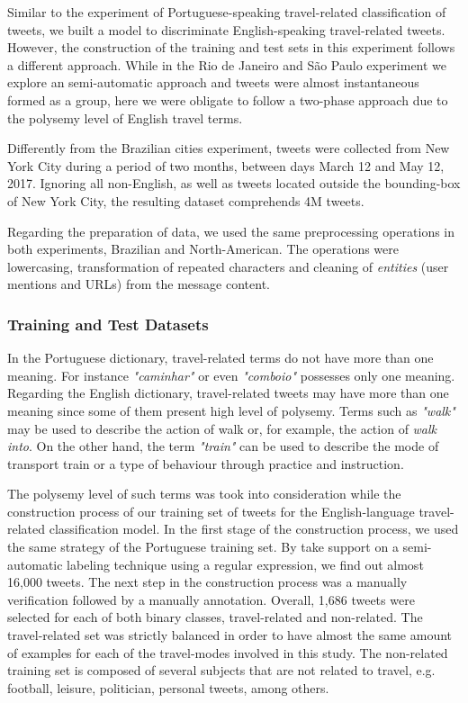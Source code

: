 Similar to the experiment of Portuguese-speaking travel-related classification of tweets, we built a model to discriminate English-speaking travel-related tweets. However, the construction of the training and test sets in this experiment follows a different approach. While in the Rio de Janeiro and São Paulo experiment we explore an semi-automatic approach and tweets were almost instantaneous formed as a group, here we were obligate to follow a two-phase approach due to the polysemy level of English travel terms.

Differently from the Brazilian cities experiment, tweets were collected from New York City during a period of two months, between days March 12 and May 12, 2017. Ignoring all non-English, as well as tweets located outside the bounding-box of New York City, the resulting dataset comprehends 4M tweets.

Regarding the preparation of data, we used the same preprocessing operations in both experiments, Brazilian and North-American. The operations were lowercasing, transformation of repeated characters and cleaning of \emph{entities} (user mentions and URLs) from the message content.

\subsubsection{Training and Test Datasets}

In the Portuguese dictionary, travel-related terms do not have more than one meaning. For instance \emph{"caminhar"} or even \emph{"comboio"} possesses only one meaning. Regarding the English dictionary, travel-related tweets may have more than one meaning since some of them present high level of polysemy. Terms such as \emph{"walk"} may be used to describe the action of walk or, for example, the action of \emph{walk into}. On the other hand, the term \emph{"train"} can be used to describe the mode of transport train or a type of behaviour through practice and instruction.

The polysemy level of such terms was took into consideration while the construction process of our training set of tweets for the English-language travel-related classification model. In the first stage of the construction process, we used the same strategy of the Portuguese training set. By take support on a semi-automatic labeling technique using a regular expression, we find out almost 16,000 tweets. The next step in the construction process was a manually verification followed by a manually annotation. Overall, 1,686 tweets were selected for each of both binary classes, travel-related and non-related. The travel-related set was strictly balanced in order to have almost the same amount of examples for each of the travel-modes involved in this study. The non-related training set is composed of several subjects that are not related to travel, e.g. football, leisure, politician, personal tweets, among others.

